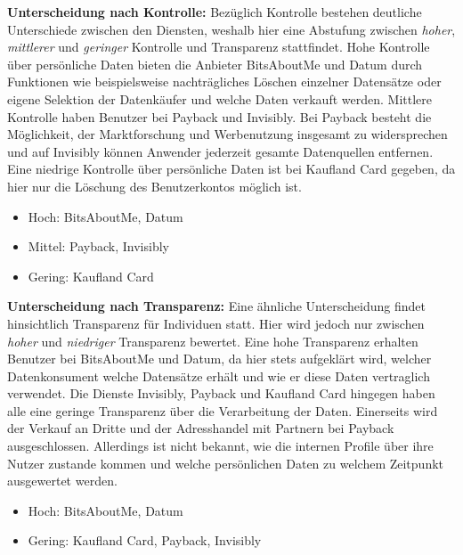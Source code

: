 \noindent \textbf{Unterscheidung nach Kontrolle:} Bezüglich Kontrolle bestehen deutliche Unterschiede zwischen den Diensten, weshalb hier eine Abstufung zwischen \textit{hoher}, \textit{mittlerer} und \textit{geringer} Kontrolle und Transparenz stattfindet. Hohe Kontrolle über persönliche Daten bieten die Anbieter BitsAboutMe und Datum durch Funktionen wie beispielsweise nachträgliches Löschen einzelner Datensätze oder eigene Selektion der Datenkäufer und welche Daten verkauft werden. Mittlere Kontrolle haben Benutzer bei Payback und Invisibly. Bei Payback besteht die Möglichkeit, der Marktforschung und Werbenutzung insgesamt zu widersprechen und auf Invisibly können Anwender jederzeit gesamte Datenquellen entfernen. Eine niedrige Kontrolle über persönliche Daten ist bei Kaufland Card gegeben, da hier nur die Löschung des Benutzerkontos möglich ist.
\begin{itemize}
    \item Hoch: BitsAboutMe, Datum
    \item Mittel: Payback, Invisibly
    \item Gering: Kaufland Card
\end{itemize}

\noindent \textbf{Unterscheidung nach Transparenz:} Eine ähnliche Unterscheidung findet hinsichtlich Transparenz für Individuen statt. Hier wird jedoch nur zwischen \textit{hoher} und \textit{niedriger} Transparenz bewertet. Eine hohe Transparenz erhalten Benutzer bei BitsAboutMe und Datum, da hier stets aufgeklärt wird, welcher Datenkonsument welche Datensätze erhält und wie er diese Daten vertraglich verwendet. Die Dienste Invisibly, Payback und Kaufland Card hingegen haben alle eine geringe Transparenz über die Verarbeitung der Daten. Einerseits wird der Verkauf an Dritte und der Adresshandel mit Partnern bei Payback ausgeschlossen. Allerdings ist nicht bekannt, wie die internen Profile über ihre Nutzer zustande kommen und welche persönlichen Daten zu welchem Zeitpunkt ausgewertet werden.
\begin{itemize}
    \item Hoch: BitsAboutMe, Datum
    \item Gering: Kaufland Card, Payback, Invisibly
\end{itemize}